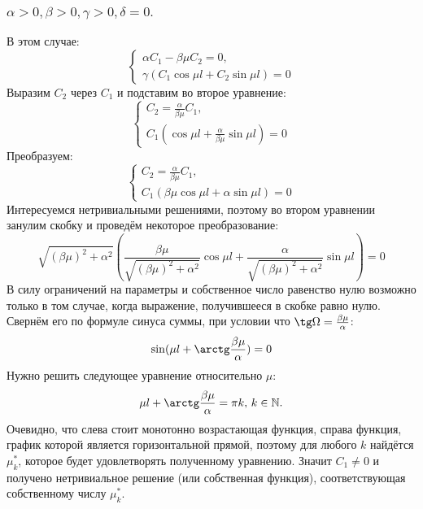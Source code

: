 \documentclass[12pt, a4paper]{report}
\begin{document}
\subsubsection{ $ \alpha > 0, \beta > 0, \gamma > 0, \delta = 0. $}
В этом случае:
\begin{displaymath}
	\begin{cases}
		\alpha C_{1} - \beta \mu C_{2} = 0, \\
		\gamma (C_{1} \cos \mu l + C_{2} \sin \mu l) = 0
	\end{cases}
\end{displaymath}
Выразим $C_{2}$ через $C_{1}$ и подставим во второе уравнение:
\begin{displaymath}
	\begin{cases}
		C_{2} = \frac{\alpha}{\beta \mu} C_{1}, \\
		C_{1} (\cos \mu l + \frac{\alpha}{\beta \mu} \sin \mu l) = 0
	\end{cases}
\end{displaymath}
Преобразуем:
\begin{displaymath}
	\begin{cases}
		C_{2} = \frac{\alpha}{\beta \mu} C_{1}, \\
		C_{1} (\beta \mu \cos \mu l + \alpha \sin \mu l) = 0
	\end{cases}
\end{displaymath}
Интересуемся нетривиальными решениями, поэтому во втором уравнении занулим скобку и проведём некоторое преобразование:
\[ \sqrt{(\beta \mu)^2 + \alpha^2} (\frac{\beta \mu}{\sqrt{(\beta \mu)^2 + \alpha^2}} \cos \mu l + \frac{\alpha}{\sqrt{(\beta \mu)^2 + \alpha^2}} \sin \mu l) = 0 \]
В силу ограничений на параметры и собственное число равенство нулю возможно только в том случае, когда выражение, получившееся в скобке равно нулю. Свернём его по формуле синуса суммы, при условии что $\tg \Omega = \frac{\beta \mu}{\alpha}$:
\[ \sin (\mu l + \arctg \frac{\beta \mu}{\alpha}) = 0 \]
Нужно решить следующее уравнение относительно $\mu$:
\[ \mu l + \arctg \frac{\beta \mu}{\alpha} = \pi k, \, k \in \mathbb{N}. \]
Очевидно, что слева стоит монотонно возрастающая функция, справа функция, график которой является горизонтальной прямой, поэтому для любого $k$ найдётся $\mu ^{*}_{k}$, которое будет удовлетворять полученному уравнению. Значит $C_{1} \ne 0$ и получено нетривиальное решение (или собственная функция), соответствующая собственному числу $\mu ^{*}_{k}$.
\end{document}
